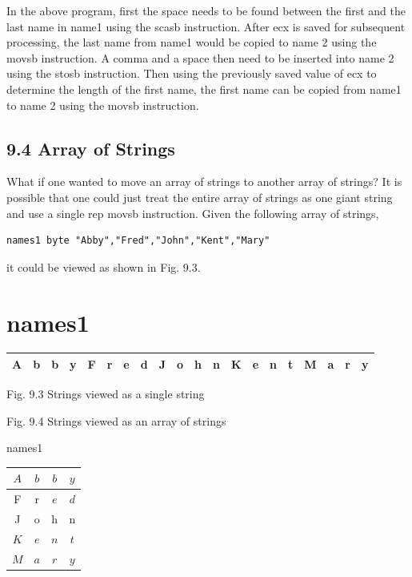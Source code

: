 \documentclass[10pt]{article}
\begin{document}
In the above program, first the space needs to be found between the first and the last name in name1 using the scasb instruction. After ecx is saved for subsequent processing, the last name from name1 would be copied to name 2 using the movsb instruction. A comma and a space then need to be inserted into name 2 using the stosb instruction. Then using the previously saved value of ecx to determine the length of the first name, the first name can be copied from name1 to name 2 using the movsb instruction.

\subsection*{9.4 Array of Strings}
What if one wanted to move an array of strings to another array of strings? It is possible that one could just treat the entire array of strings as one giant string and use a single rep movsb instruction. Given the following array of strings,

\begin{verbatim}
names1 byte "Abby","Fred","John","Kent","Mary"
\end{verbatim}

it could be viewed as shown in Fig. 9.3.

\section*{names1}
\begin{center}
\begin{tabular}{|l|l|l|l|l|l|l|l|l|l|l|l|l|l|l|l|l|l|l|l|}
\hline
A & b & b & y & F & r & e & d & J & o & h & n & K & e & n & t & M & a & r & y \\
\hline
\end{tabular}
\end{center}

Fig. 9.3 Strings viewed as a single string

Fig. 9.4 Strings viewed as an array of strings

names1 \begin{tabular}{|c|c|c|c|}
\hline
$A$ & $b$ & $b$ & $y$ \\
\hline
F & r & $e$ & $d$ \\
\hline
J & o & h & n \\
\hline
$K$ & $e$ & $n$ & $t$ \\
\hline
$M$ & $a$ & $r$ & $y$ \\
\hline
\end{tabular}
\end{document}

